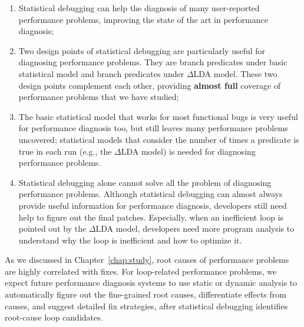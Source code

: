 \begin{enumerate}
\item Statistical debugging can help the diagnosis of many
user-reported performance problems, improving the state of the art in 
performance diagnosis;

\item Two design points of statistical debugging are particularly useful
for diagnosing performance problems. They are branch predicates under
basic statistical model and branch predicates under $\Delta$LDA model.
These two design points complement each other, providing
\textbf{almost full} coverage of performance problems that we have studied;

\item The basic statistical model that works for most functional bugs
\citep{liblit03,liblit05,tarantula1,tarantula2,tarantula.darko,CCI,joy.asplos13}
is very useful for performance diagnosis too, but still leaves many performance
problems uncovered; statistical models that
consider the number of times a predicate is true 
in each run (e.g., the $\Delta$LDA model)
is needed for diagnosing performance problems.

\item Statistical debugging alone cannot solve all the problem
of diagnosing performance problems. Although statistical debugging
can almost always provide useful information for performance diagnosis, 
developers still
need help to figure out the final patches. Especially, when an inefficient
loop is pointed out by the $\Delta$LDA model, 
developers need more program analysis to understand why the loop is inefficient
and how to optimize it.
\end{enumerate}

As we discussed in Chapter~\ref{chap:study}, 
root causes of performance problems are highly correlated with fixes.
For loop-related performance problems, 
we expect future performance diagnosis systems to use static or
dynamic analysis to automatically figure out the fine-grained 
root causes, differentiate effects from causes, and suggest
detailed fix strategies, after statistical debugging identifies
root-cause loop candidates.


